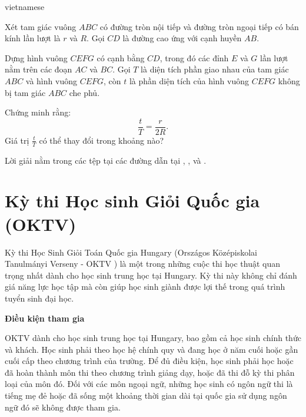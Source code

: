 \documentclass{article}
\begin{document}
\begin{otherlanguage*}{vietnamese}
\begin{problem*}
    Xét tam giác vuông \( ABC \) có đường tròn nội tiếp và đường tròn ngoại tiếp có bán kính lần lượt là \( r \) và \( R \). Gọi \( CD \) là đường cao ứng với cạnh huyền \( AB \).  
    
    Dựng hình vuông \( CEFG \) có cạnh bằng \( CD \), trong đó các đỉnh \( E \) và \( G \) lần lượt nằm trên các đoạn \( AC \) và \( BC \).
    Gọi \( T \) là diện tích phần giao nhau của tam giác \( ABC \) và hình vuông \( CEFG \), còn \( t \) là phần diện tích của hình vuông \( CEFG \) không bị tam giác \( ABC \) che phủ.  
    \begin{enumerate}[topsep=0pt, partopsep=0pt, itemsep=0pt]
        \ii Chứng minh rằng:
        \[
            \frac{t}{T} = \frac{r}{2R}.
        \]
        \ii Giá trị \( \frac{t}{T} \) có thể thay đổi trong khoảng nào?
    \end{enumerate}
\end{problem*}

\begin{remark*}
    Lời giải nằm trong các tệp tại các đường dẫn tại \cite{nmmv_9o_mo}, \cite{nmmv_10o_mo}, và \cite{nmmv_12o_mo}.
\end{remark*}

\newpage

\section{Kỳ thi Học sinh Giỏi Quốc gia (OKTV)}

Kỳ thi Học Sinh Giỏi Toán Quốc gia Hungary (Országos Középiskolai Tanulmányi Verseny - OKTV \cite{OKTV}) 
là một trong những cuộc thi học thuật quan trọng nhất dành cho học sinh trung học tại Hungary.
Kỳ thi này không chỉ đánh giá năng lực học tập mà còn giúp học sinh giành được lợi thế trong quá trình tuyển sinh đại học.

\textbf{Điều kiện tham gia}

OKTV dành cho học sinh trung học tại Hungary, bao gồm cả học sinh chính thức và khách.
Học sinh phải theo học hệ chính quy và đang học ở năm cuối hoặc gần cuối cấp theo chương trình của trường.
Để đủ điều kiện, học sinh phải học hoặc đã hoàn thành môn thi theo chương trình giảng dạy, hoặc đã thi đỗ kỳ thi phân loại của môn đó.
Đối với các môn ngoại ngữ, những học sinh có ngôn ngữ thi là tiếng mẹ đẻ hoặc đã sống một khoảng thời gian dài tại quốc gia sử dụng ngôn ngữ đó sẽ không được tham gia.


\end{otherlanguage*}
\end{document}
